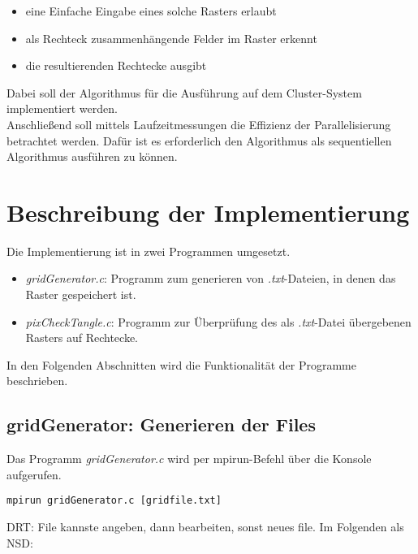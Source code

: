\documentclass[
10pt, %
a4paper, %
oneside, %
headinclude,footinclude, %
BCOR5mm, %
]{scrartcl}
\begin{document}
\begin{itemize}[noitemsep] %
	\item eine Einfache Eingabe eines solche Rasters erlaubt
	\item als Rechteck zusammenhängende Felder im Raster erkennt 
	\item die resultierenden Rechtecke ausgibt
\end{itemize}

Dabei soll der Algorithmus für die Ausführung auf dem Cluster-System implementiert werden.\\
Anschließend soll mittels Laufzeitmessungen die Effizienz der Parallelisierung betrachtet werden. Dafür ist es erforderlich den Algorithmus als sequentiellen Algorithmus ausführen zu können.
\pagebreak

\section{Beschreibung der Implementierung}

Die Implementierung ist in zwei Programmen umgesetzt. 

\begin{itemize}[noitemsep] %
	\item \textit{gridGenerator.c}: Programm zum generieren von \textit{.txt}-Dateien, in denen das Raster gespeichert ist.  
	\item \textit{pixCheckTangle.c}: Programm zur Überprüfung des als \textit{.txt}-Datei übergebenen Rasters auf Rechtecke.
\end{itemize}

In den Folgenden Abschnitten wird die Funktionalität der Programme beschrieben.

\subsection{gridGenerator: Generieren der Files}

Das Programm \textit{gridGenerator.c} wird per mpirun-Befehl über die Konsole aufgerufen.

\begin{lstlisting}
mpirun gridGenerator.c [gridfile.txt]
\end{lstlisting}


DRT: File kannste angeben, dann bearbeiten, sonst neues file. Im Folgenden als NSD:
\end{document}
